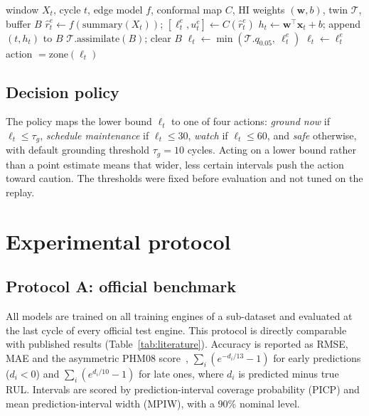 \documentclass[pdflatex,sn-mathphys-num]{sn-jnl}
\begin{document}
\begin{algorithm}[t]
\caption{Per-cycle hybrid estimator for one engine}\label{alg:hybrid}
\begin{algorithmic}[1]
\Require window $X_t$, cycle $t$, edge model $f$, conformal map $C$, HI weights $(\mathbf{w}, b)$, twin $\mathcal{T}$, buffer $B$
\State $\hat r^{e}_t \gets f(\mathrm{summary}(X_t))$; \quad $[\ell^{e}_t, u^{e}_t] \gets C(\hat r^{e}_t)$
\State $h_t \gets \mathbf{w}^\top \mathbf{x}_t + b$; \quad append $(t, h_t)$ to $B$
  \State $\mathcal{T}.\mathrm{assimilate}(B)$; \quad clear $B$
  \State $\ell_t \gets \min(\mathcal{T}.q_{0.05},\ \ell^{e}_t)$
\Else
  \State $\ell_t \gets \ell^{e}_t$
\EndIf
\State \Return action $= \mathrm{zone}(\ell_t)$
\end{algorithmic}
\end{algorithm}

\subsection{Decision policy}\label{sec:policy}
The policy maps the lower bound $\ell_t$ to one of four actions: \emph{ground now} if $\ell_t \le \tau_g$, \emph{schedule maintenance} if $\ell_t \le 30$, \emph{watch} if $\ell_t \le 60$, and \emph{safe} otherwise, with default grounding threshold $\tau_g = 10$ cycles. Acting on a lower bound rather than a point estimate means that wider, less certain intervals push the action toward caution. The thresholds were fixed before evaluation and not tuned on the replay.

\section{Experimental protocol}\label{sec:protocol}

\subsection{Protocol A: official benchmark}
All models are trained on all training engines of a sub-dataset and evaluated at the last cycle of every official test engine. This protocol is directly comparable with published results (Table~\ref{tab:literature}). Accuracy is reported as RMSE, MAE and the asymmetric PHM08 score~\cite{saxena2008damage}, $\sum_i (e^{-d_i/13}-1)$ for early predictions ($d_i<0$) and $\sum_i (e^{d_i/10}-1)$ for late ones, where $d_i$ is predicted minus true RUL. Intervals are scored by prediction-interval coverage probability (PICP) and mean prediction-interval width (MPIW), with a 90\% nominal level.
\end{document}
